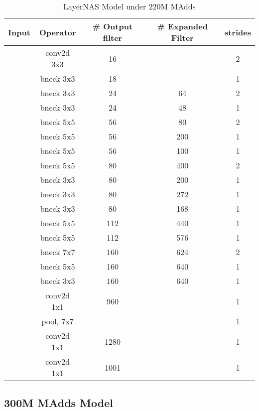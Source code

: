 \begin{table}
\caption{LayerNAS Model under 220M MAdds} 
\begin{center}

\begin{tabular}[hp]{c|c|c|c|c}
\hline
\hline
 Input &Operator  &\# Output filter &\# Expanded Filter &strides\\ 
\hline
  &conv2d 3x3 &16 & &2 \\
\hline
  &bneck 3x3 &18 & &1 \\
\hline
  &bneck 3x3 &24 &64 &2 \\
  &bneck 3x3 &24 &48 &1 \\
\hline
  &bneck 5x5 &56 &80 &2 \\
  &bneck 5x5 &56 &200 &1 \\
  &bneck 5x5 &56 &100 &1 \\
\hline
  &bneck 5x5 &80 &400 &2 \\
  &bneck 3x3 &80 &200 &1 \\
  &bneck 3x3 &80 &272 &1 \\
  &bneck 3x3 &80 &168 &1 \\
 \hline
  &bneck 5x5 &112 &440 &1 \\
  &bneck 5x5 &112 &576 &1 \\
 \hline
  &bneck 7x7 &160 &624 &2 \\
  &bneck 5x5 &160 &640 &1 \\
  &bneck 3x3 &160 &640 &1 \\
\hline
  &conv2d 1x1 &960 & &1 \\
  &pool, 7x7  & & &1\\
  &conv2d 1x1  &1280 & &1 \\
  &conv2d 1x1 &1001 & &1 \\
\hline
\hline

\end{tabular}
\end{center}
\end{table}



\subsection{300M MAdds Model}



